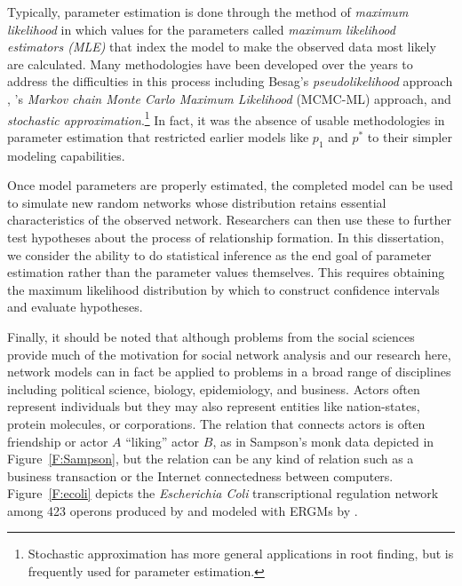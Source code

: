 Typically, parameter estimation is done through the method of 
\emph{maximum likelihood} in which values for the parameters called \emph{maximum 
likelihood estimators (MLE)} that index the model to make the observed data most likely 
are calculated.
Many methodologies have been developed over the years to address the difficulties
in this process
including Besag's \emph{pseudolikelihood} approach \citep{Besag:1974,Strauss:1990}, 
\citeauthor{Geyer:1992}'s \citeyearpar{Geyer:1992}
\emph{Markov chain Monte Carlo Maximum Likelihood} (MCMC-ML) approach, and 
\emph{stochastic approximation}.\footnote{Stochastic approximation has more general
applications in root finding, but is frequently used for parameter estimation.}
In fact, it was the absence of usable methodologies in parameter estimation that 
restricted earlier models like $p_1$ and $p^*$ to their simpler modeling capabilities.


Once model parameters are properly estimated, the completed model can be used to simulate 
new random networks whose distribution retains essential characteristics of 
the observed network.  Researchers can then use these 
to further test hypotheses about the process of relationship formation.  
In this dissertation, we consider the ability to do statistical inference 
as the end goal of parameter estimation rather than the parameter values 
themselves.  This requires obtaining the maximum likelihood distribution by which
to construct confidence intervals and evaluate hypotheses.



Finally, it should be noted that although problems from the social sciences provide much of the 
motivation for social network analysis and our research here, network models can in 
fact be applied to problems in a broad range of disciplines including political 
science, biology, epidemiology, and business.  Actors often represent individuals but 
they may also represent entities like nation-states, protein molecules, or 
corporations.  The relation that connects actors is often friendship or actor $A$ 
``liking'' actor $B$, as in Sampson's monk data depicted in Figure~\ref{F:Sampson}, 
but the relation can be any kind of relation such as a business transaction or the 
Internet connectedness between computers.  Figure~\ref{F:ecoli} depicts the 
\textit{Escherichia Coli} transcriptional regulation network among 423 operons produced by 
\citet*{Salgado,Shen-Orr} and modeled with ERGMs by \citet*{Saul:2007,Hummel}.

